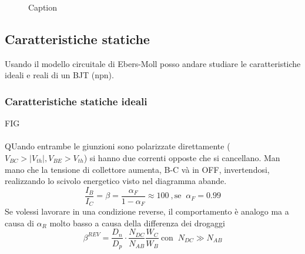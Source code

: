 \begin{figure}[hbt!]
    \centering
    \caption{Caption}
    \label{fig:enter-label}
\end{figure}
%
\subsection{Caratteristiche statiche}
Usando il modello circuitale di Ebers-Moll posso andare studiare le caratteristiche ideali e reali di un BJT (npn).
\subsubsection{Caratteristiche statiche ideali}
FIG\\
\\
QUando entrambe le giunzioni sono polarizzate direttamente ($V_{BC}>|V_{th}|, V_{BE}>V_{th}$) si hanno due correnti opposte che si cancellano. Man mano che la tensione di collettore aumenta, B-C và in OFF, invertendosi, realizzando lo scivolo energetico visto nel diagramma abande.\\
\begin{equation}
    \dfrac{I_B}{I_C}=\beta=\dfrac{\alpha_F}{1-\alpha_F}\approx 100 \ , \text{se }\ \alpha_F=0.99
\end{equation}
Se volessi lavorare in una condizione reverse, il comportamento è analogo ma a causa di $\alpha_R$ molto basso a causa della differenza dei drogaggi
%
\begin{equation}
    \beta^{REV}=\dfrac{D_n}{D_p}\cdot \dfrac{N_{DC}}{N_{AB}}\dfrac{W_C}{W_B} \ \text{con }\ N_{DC}\gg N_{AB}
\end{equation}
%
